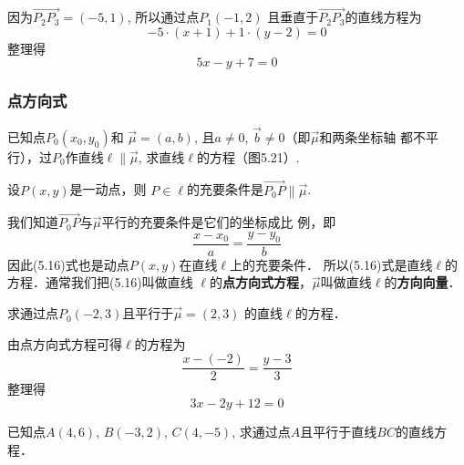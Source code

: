 \begin{solution}
因为$\Vec{P_2P_3}=(-5,1)$, 所以通过点$P_1(-1,2)$
且垂直于$\Vec{P_2P_3}$的直线方程为
\[-5\cdot (x+1)+1\cdot (y-2)=0\]
整理得
\[5x-y+7=0\]
\end{solution}

\subsubsection{点方向式}
已知点$P_0(x_0,y_0)$和
$\vec{\mu}=(a,b)$, 且$a\ne 0$, 
$\vec{b}\ne 0$（即$\vec{\mu}$和两条坐标轴
都不平行），过$P_0$作直线$\ell\parallel \vec{\mu}$, 
求直线$\ell$的方程（图5.21）.

\begin{figure}[htp]
    \centering
{}
    \caption{}
\end{figure}


设$P(x,y)$是一动点，则
$P\in\ell$的充要条件是$\Vec{P_0P}\parallel \vec{\mu}$.

我们知道$\Vec{P_0P}$与$\vec{\mu}$平行的充要条件是它们的坐标成比
例，即
\begin{equation}
    \frac{x-x_0}{a}=\frac{y-y_0}{b}
\end{equation}
因此(5.16)式也是动点$P(x,y)$在直线$\ell$上的充要条件．
所以(5.16)式是直线$\ell$的方程．通常我们把(5.16)叫做直线
$\ell$的\textbf{点方向式方程}，$\vec{\mu}$叫做直线$\ell$的\textbf{方向向量}．

\begin{example}
    求通过点$P_0(-2,3)$且平行于$\vec{\mu}=(2,3)$
的直线$\ell$的方程．
\end{example}

\begin{solution}
    由点方向式方程可得$\ell$的方程为
\[\frac{x -(-2)}{2} =\frac{y-3}{3}\]
整理得
\[3x-2y+12=0\]
\end{solution}

\begin{example}
    已知点$A(4,6)$, $B(-3,2)$, $C(4,-5)$, 
求通过点$A$且平行于直线$BC$的直线方程．
\end{example}

